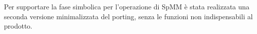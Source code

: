 Per supportare la fase simbolica per l'operazione di SpMM è stata realizzata una seconda versione minimalizzata del porting,
senza le funzioni non indispensabili al prodotto.\\

%

